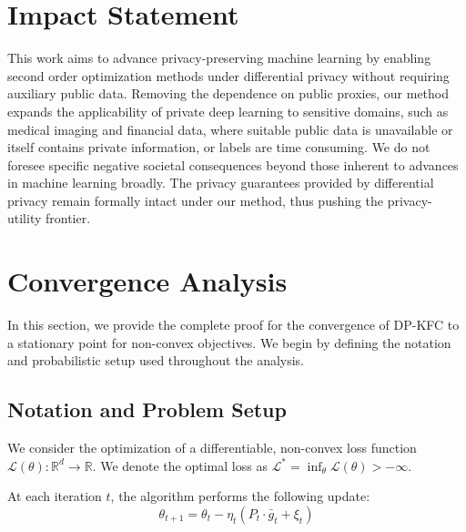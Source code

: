 \documentclass{article}
\theoremstyle{plain}
\theoremstyle{definition}
\theoremstyle{remark}
\begin{document}
\clearpage 

\section*{Impact Statement}

This work aims to advance privacy-preserving machine learning by enabling second order optimization methods under differential privacy without requiring auxiliary public data. Removing the dependence on public proxies, our method expands the applicability of private deep learning to sensitive domains, such as medical imaging and financial data, where suitable public data is unavailable or itself contains private information, or labels are time consuming. We do not foresee specific negative societal consequences beyond those inherent to advances in machine learning broadly. The privacy guarantees provided by differential privacy remain formally intact under our method, thus pushing the privacy-utility frontier.


\clearpage





\clearpage


\onecolumn


\appendix

\section{Convergence Analysis}
\label{app:convergence_proof}
In this section, we provide the complete proof for the convergence of DP-KFC to a stationary point for non-convex objectives. We begin by defining the notation and probabilistic setup used throughout the analysis.

\subsection{Notation and Problem Setup}

We consider the optimization of a differentiable, non-convex loss function $\mathcal{L}(\theta): \mathbb{R}^d \to \mathbb{R}$. We denote the optimal loss as $\mathcal{L}^* = \inf_\theta \mathcal{L}(\theta) > -\infty$.

At each iteration $t$, the algorithm performs the following update:
\begin{equation}
    \theta_{t+1} = \theta_t - \eta_t \left( P_t \cdot \bar{g}_t + \xi_t \right)
\end{equation}
\end{document}
